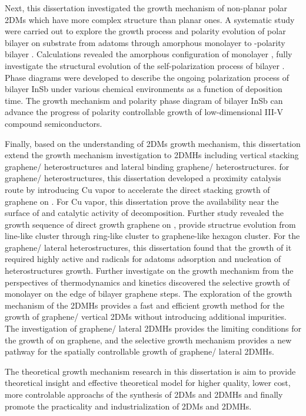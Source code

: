 \begin{englishabstract}
    Next, this dissertation investigated the growth mechanism of non-planar polar 2DMs which have more complex structure than planar ones. A systematic study were carried out to explore the growth process and polarity evolution of polar bilayer  on  substrate from adatoms through amorphous monolayer to -polarity bilayer . Calculations revealed the amorphous configuration of monolayer , fully investigate the structural evolution of the self-polarization process of bilayer . Phase diagrams were developed to describe the ongoing polarization process of bilayer InSb under various chemical environments as a function of deposition time. The growth mechanism and polarity phase diagram of bilayer InSb can advance the progress of polarity controllable growth of low-dimensional III-V compound semiconductors.

    Finally, based on the understanding of 2DMs growth mechanism, this dissertation extend the growth mechanism investigation to 2DMHs including vertical stacking graphene/  heterostructures and lateral binding graphene/ heterostructures. for graphene/  heterostructures, this dissertation developed a proximity catalysis route by introducing Cu vapor to accelerate the direct stacking growth of graphene on . For Cu vapor, this dissertation prove the availability near the surface of  and catalytic activity of  decomposition. Further study revealed the growth sequence of direct growth graphene on , provide structrue evolution from line-like cluster through ring-like cluster to graphene-like hexagon cluster. For the graphene/ lateral heterostructures, this dissertation found that the growth of it required highly active  and  radicals for adatoms adsorption and nucleation of heterostructures growth. Further investigate on the growth mechanism from the perspectives of thermodynamics and kinetics discovered the selective growth of monolayer  on the edge of bilayer graphene steps. 
    The exploration of the growth mechanism of the 2DMHs provides a fast and efficient growth method for the growth of graphene/  vertical 2DMs without introducing additional impurities. The investigation of graphene/ lateral 2DMHs provides the limiting conditions for the growth of  on graphene, and the selective growth mechanism provides a new pathway for the spatially controllable growth of graphene/ lateral 2DMHs. 

    The theoretical growth mechanism research in this dissertation is aim to provide theoretical insight and effective theoretical model for higher quality, lower cost, more controlable approachs of the synthesis of 2DMs and 2DMHs and finally promote the practicality and industrialization of 2DMs and 2DMHs.
    
\end{englishabstract}